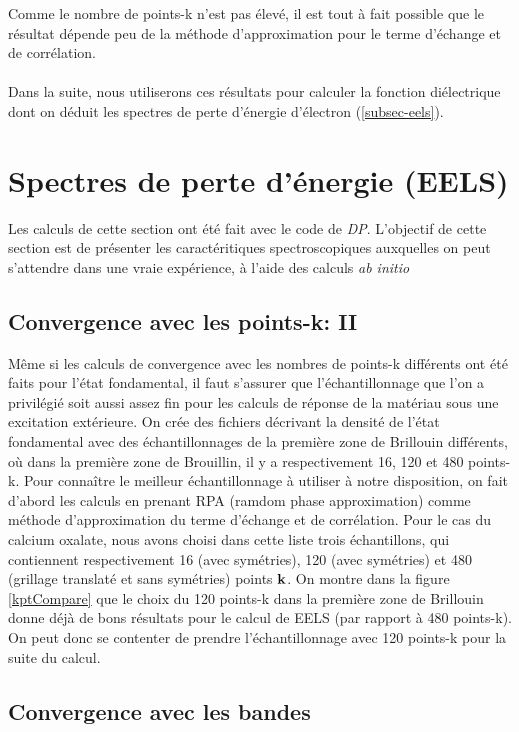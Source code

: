 Comme le nombre de points-k n'est pas élevé, il est tout à fait possible que le résultat dépende peu de la méthode d'approximation pour le terme d'échange et de corrélation.
\\\\Dans la suite, nous utiliserons ces résultats pour calculer la fonction diélectrique dont on déduit les spectres de perte d'énergie d'électron (\cref{subsec-eels}).
\section{Spectres de perte d'énergie (EELS)}
Les calculs de cette section ont été fait avec le code de \textit{DP}. 
L'objectif de cette section est de présenter les caractéritiques spectroscopiques auxquelles on peut s'attendre dans une vraie expérience,
à l'aide des calculs \textit{ab initio}
\subsection{Convergence avec les points-k: II}
Même si les calculs de convergence avec les nombres de points-k différents ont été faits pour l'état fondamental, il faut s'assurer que l'échantillonnage que l'on a privilégié soit aussi assez fin pour les calculs de réponse de la matériau sous une excitation extérieure. 
On crée des fichiers décrivant la densité de l'état fondamental avec des échantillonnages de la première zone de Brillouin différents, où dans la première zone de Brouillin, il y a respectivement 16, 120 et 480 points-k. 
Pour connaître le meilleur échantillonnage à utiliser à notre disposition, on fait d'abord les calculs en prenant RPA (ramdom phase approximation) comme méthode d'approximation du terme d'échange et de corrélation.
Pour le cas du calcium oxalate, nous avons choisi dans cette liste trois échantillons,
qui contiennent respectivement 16 (avec symétries),
120 (avec symétries) et 480 (grillage translaté et sans symétries) points $\vb{k}$.
On montre dans la figure \ref{kptCompare} que le choix du 120 points-k dans la première zone de Brillouin donne déjà de bons résultats pour le calcul de EELS (par rapport à 480 points-k). On peut donc se contenter de prendre l'échantillonnage avec 120 points-k pour la suite du calcul.

\subsection{Convergence avec les bandes}

